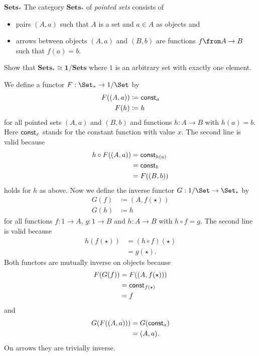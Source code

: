 \begin{definition}{$\mathbf{Sets_*}$}
  The category $\mathbf{Sets_*}$ of \emph{pointed sets} consists of
  \begin{itemize}
  \item pairs $(A,a)$ such that $A$ is a set and $a\in A$ as objects and
  \item arrows between objects $(A,a)$ and $(B,b)$ are functions $f\from A\to B$ such that $f(a)=b$.
  \end{itemize}
\end{definition}

\begin{exercise}
Show that $\mathbf{Sets_*\cong 1/\mathbf{Sets}}$ where $1$ is an arbitrary set with exactly one element.
\end{exercise}

\begin{answer}
  We define a functor $F : \Set_* \to 1/\Set$ by
  \begin{align*}
    F((A, a)) &\coloneqq \mathsf{const}_{a} \\
    F(h) &\coloneqq h
  \end{align*}
  for all pointed sets $(A, a)$ and $(B, b)$ and functions $h : A \to B$ with $h(a) = b$.
  Here $\mathsf{const}_{x}$ stands for the constant function with value $x$.
  The second line is valid because
  \[ \begin{split}
    h \circ F((A, a))
    &= \mathsf{const}_{h(a)} \\
    &= \mathsf{const}_{b} \\
    &= F((B, b))
  \end{split} \]
  holds for $h$ as above.
  Now we define the inverse functor $G : 1/\Set \to \Set_*$ by
  \begin{align*}
    G(f) &\coloneqq (A, f(\star)) \\
    G(h) &\coloneqq h
  \end{align*}
  for all functions $f : 1 \to A$, $g : 1 \to B$ and $h : A \to B$ with $h \circ f = g$.
  The second line is valid because
  \[ \begin{split}
    h(f(\star))
    &= (h \circ f)(\star) \\
    &= g(\star).
  \end{split} \]
  Both functors are mutually inverse on objects because
  \[ \begin{split}
    F(G(f))
    &= F((A, f(\star))) \\
    &= \mathsf{const}_{f(\star)} \\
    &= f
  \end{split} \]
  and
  \[ \begin{split}
    G(F((A, a)))
    &= G(\mathsf{const}_{a}) \\
    &= (A, a).
  \end{split} \]
  On arrows they are trivially inverse.
\end{answer}

